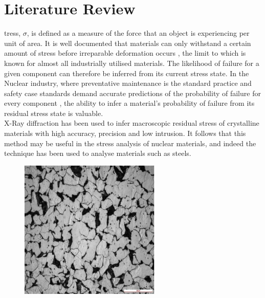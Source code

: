 %
%
\let\textcircled=\pgftextcircled
\chapter{Literature Review}
\label{chap:intro}

tress, $\sigma$, is defined as a measure of the force that an object is experiencing per unit of area.\cite{woodford_1993_mechanical} It is well documented that materials can only withstand a certain amount of stress before irreparable deformation occurs \cite{voight_1989_a} \cite{matsuoka_1990_a}, the limit to which is known for almost all industrially utilised materials. \cite{cambridgeuniversityengineeringdepartment_2003_materials} The likelihood of failure for a given component can therefore be inferred from its current stress state.\cite{todinov_2006_equations} In the Nuclear industry, where preventative maintenance is the standard practice and safety case standards demand accurate predictions of the probability of failure for every component \cite{internationalatomicenergyagency_2007_safety}, the ability to infer a material's probability of failure from its residual stress state is valuable. \\

X-Ray diffraction has been used to infer macroscopic residual stress of crystalline materials with high accuracy, precision and low intrusion.\cite{welzel_2005_stress} It follows that this method may be useful in the stress analysis of nuclear materials, and indeed the technique has been used to analyse materials such as steels. \cite{epp_2012_in}\\

 \begin{figure}[h]
 	\centering
 	\includegraphics[width=0.6\textwidth]{chapters/chapter01/fig01/microstructure.png}
    \label{fig:RHP02}
 \end{figure}

